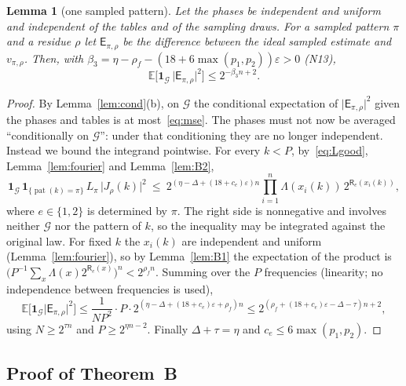 \documentclass[11pt]{article}
\newtheorem{lemma}{Lemma}[section]
\theoremstyle{definition}
\newcommand{\E}{\mathbb E}
\newcommand{\eps}{\varepsilon}
\newcommand{\abs}[1]{\lvert #1\rvert}
\newcommand{\cG}{\mathcal G}
\newcommand{\pat}{\operatorname{pat}}
\begin{document}
\begin{lemma}[one sampled pattern]\label{lem:B3}
Let the phases be independent and uniform and independent of the tables and of the sampling draws. For a sampled
pattern $\pi$ and a residue $\rho$ let $\mathsf E_{\pi,\rho}$ be the difference between the ideal sampled estimate
and $v_{\pi,\rho}$. Then, with $\beta_3=\eta-\rho_f-(18+6\max(p_1,p_2))\eps>0$ \textup{(N13)},
\[
 \E\bigl[\mathbf 1_{\cG}\,\abs{\mathsf E_{\pi,\rho}}^2\bigr]\le2^{-\beta_3n+2}.
\]
\end{lemma}
\begin{proof}
By Lemma~\ref{lem:cond}(b), on $\cG$ the conditional expectation of $\abs{\mathsf E_{\pi,\rho}}^2$ given the phases
and tables is at most~\eqref{eq:mse}. The phases must not now be averaged ``conditionally on $\cG$'': under that
conditioning they are no longer independent. Instead we bound the integrand pointwise. For every $k<P$,
by~\eqref{eq:Lgood}, Lemma~\ref{lem:fourier} and Lemma~\ref{lem:B2},
\begin{equation}\label{eq:pointwise}
 \mathbf 1_{\cG}\,\mathbf 1_{\{\pat(k)=\pi\}}\,L_\pi\,\abs{J_\rho(k)}^2
 \ \le\ 2^{(\eta-\Delta+(18+c_e)\eps)n}\prod_{i=1}^n\Lambda(x_i(k))\,2^{\mathsf R_e(x_i(k))},
\end{equation}
where $e\in\{1,2\}$ is determined by $\pi$. The right side is nonnegative and involves neither $\cG$ nor the pattern
of $k$, so the inequality may be integrated against the original law. For fixed $k$ the $x_i(k)$ are independent and
uniform (Lemma~\ref{lem:fourier}), so by Lemma~\ref{lem:B1} the expectation of the product is
$\bigl(P^{-1}\sum_x\Lambda(x)2^{\mathsf R_e(x)}\bigr)^n<2^{\rho_fn}$. Summing over the $P$ frequencies (linearity; no
independence between frequencies is used),
\[
 \E\bigl[\mathbf 1_{\cG}\abs{\mathsf E_{\pi,\rho}}^2\bigr]\le\frac{1}{NP^2}\cdot P\cdot2^{(\eta-\Delta+(18+c_e)\eps+\rho_f)n}
 \le2^{(\rho_f+(18+c_e)\eps-\Delta-\tau)n+2},
\]
using $N\ge2^{\tau n}$ and $P\ge2^{\eta n-2}$. Finally $\Delta+\tau=\eta$ and $c_e\le6\max(p_1,p_2)$.
\end{proof}

\subsection{Proof of Theorem~B}
\end{document}
